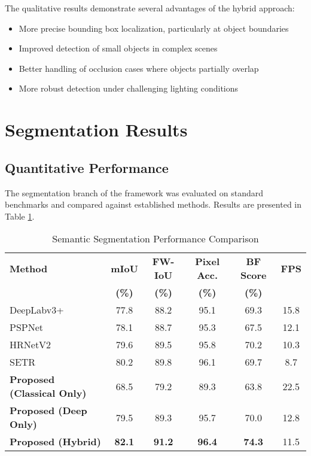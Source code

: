 
The qualitative results demonstrate several advantages of the hybrid approach:

\begin{itemize}
    \item More precise bounding box localization, particularly at object boundaries
    \item Improved detection of small objects in complex scenes
    \item Better handling of occlusion cases where objects partially overlap
    \item More robust detection under challenging lighting conditions
\end{itemize}

\section{Segmentation Results}

\subsection{Quantitative Performance}
The segmentation branch of the framework was evaluated on standard benchmarks and compared against established methods. Results are presented in Table \ref{tab:segmentation_results}.

\begin{table}[h]
\centering
\caption{Semantic Segmentation Performance Comparison}
\label{tab:segmentation_results}
\begin{tabular}{lccccc}
\hline
\textbf{Method} & \textbf{mIoU} & \textbf{FW-IoU} & \textbf{Pixel Acc.} & \textbf{BF Score} & \textbf{FPS} \\
 & \textbf{(\%)} & \textbf{(\%)} & \textbf{(\%)} & \textbf{(\%)} & \\
\hline
DeepLabv3+ \cite{chen2018encoder} & 77.8 & 88.2 & 95.1 & 69.3 & 15.8 \\
PSPNet \cite{zhao2017pyramid} & 78.1 & 88.7 & 95.3 & 67.5 & 12.1 \\
HRNetV2 \cite{wang2020deep} & 79.6 & 89.5 & 95.8 & 70.2 & 10.3 \\
SETR \cite{zheng2021rethinking} & 80.2 & 89.8 & 96.1 & 69.7 & 8.7 \\
\hline
\textbf{Proposed (Classical Only)} & 68.5 & 79.2 & 89.3 & 63.8 & 22.5 \\
\textbf{Proposed (Deep Only)} & 79.5 & 89.3 & 95.7 & 70.0 & 12.8 \\
\textbf{Proposed (Hybrid)} & \textbf{82.1} & \textbf{91.2} & \textbf{96.4} & \textbf{74.3} & 11.5 \\
\hline
\end{tabular}
\end{table}


